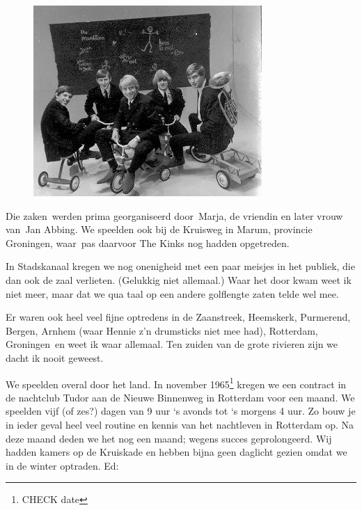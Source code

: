\documentclass[10pt,twoside, openright]{memoir}
\begin{document}
\begin{figure}
\includegraphics[width=\textwidth]{img/ch27/hartland}
\end{figure}

Die zaken werden prima georganiseerd door Marja, de vriendin en later vrouw van Jan Abbing. We speelden ook bij de Kruisweg in Marum, provincie Groningen, waar pas daarvoor The Kinks nog hadden opgetreden.

In Stadskanaal kregen we nog onenigheid met een paar meisjes in het publiek, die dan ook de zaal verlieten. (Gelukkig niet allemaal.) Waar het door kwam weet ik niet meer, maar dat we qua taal op een andere golflengte zaten telde wel mee. 

Er waren ook heel veel fijne optredens in de Zaanstreek, Heemskerk, Purmerend, Bergen, Arnhem (waar Hennie z'n drumsticks niet mee had), Rotterdam, Groningen en weet ik waar allemaal. Ten zuiden van de grote rivieren zijn we dacht ik nooit geweest. 

We speelden overal door het land. In november 1965\footnote{CHECK date} kregen we een contract in de nachtclub Tudor aan de Nieuwe Binnenweg in Rotterdam voor een maand. We speelden vijf (of zes?) dagen van 9 uur `s avonds tot `s morgens 4 uur. Zo bouw je in ieder geval heel veel routine en kennis van het nachtleven in Rotterdam op. Na deze maand deden we het nog een maand; wegens succes geprolongeerd. Wij hadden kamers op de Kruiskade en hebben bijna geen daglicht gezien omdat we in de winter optraden. Ed: 
\end{document}
